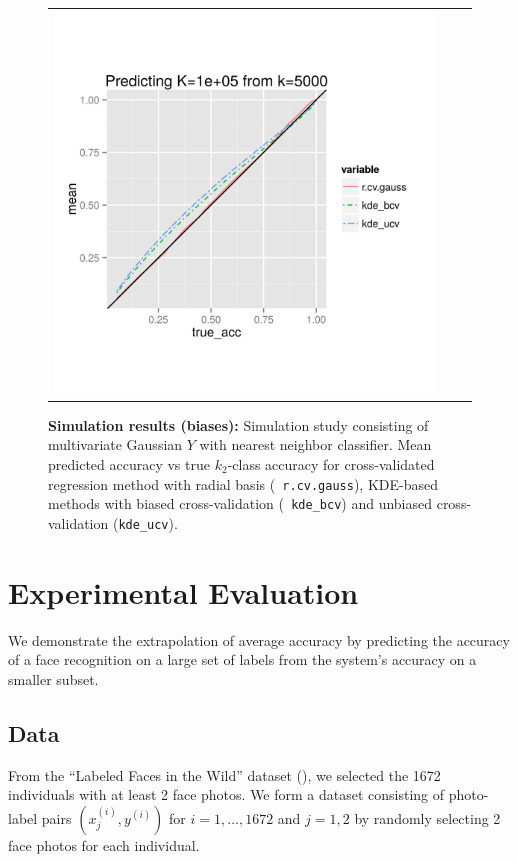 \documentclass[twoside,11pt]{article}
\begin{document}
\begin{figure}
\begin{tabular}{ccc}
\includegraphics[scale = 0.45, clip = true, trim = .5in 0 0.00in 1.03in]{sim_large7_bias_K100_k5.png}\\ 
\end{tabular}
\caption{\textbf{Simulation results (biases):} Simulation study
  consisting of multivariate Gaussian $Y$ with nearest neighbor
  classifier.  Mean predicted accuracy vs true $k_2$-class accuracy
  for cross-validated regression method with radial basis ({\tt
    r.cv.gauss}), KDE-based methods with biased cross-validation ({\tt
    kde\_bcv}) and unbiased cross-validation ({\tt kde\_ucv}).}
\label{fig:sim_study_bias}
\end{figure}





\section{Experimental Evaluation}\label{sec:extrapolation_example}

We demonstrate the extrapolation of average accuracy by predicting the
accuracy of a face recognition on a large set of labels from the
system's accuracy on a smaller subset.

\subsection{Data}
From the ``Labeled Faces in the Wild'' dataset (\cite{LFWTech}), we
selected the 1672 individuals with at least 2 face photos.  We form a
dataset consisting of photo-label pairs $(x_j^{(i)}, y^{(i)})$
for $i = 1,\hdots, 1672$ and $j = 1,2$ by randomly selecting 2 face
photos for each individual. 
\end{document}
